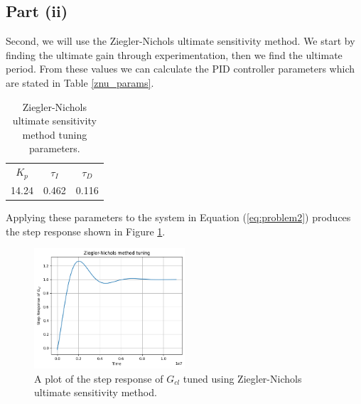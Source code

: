 \documentclass[10pt,a4paper]{article}
\begin{document}
    \subsection{Part (ii)}
        Second, we will use the Ziegler-Nichols ultimate sensitivity method. We start by finding the ultimate gain through experimentation, then we find the ultimate period. From these values we can calculate the PID controller parameters which are stated in Table \ref{znu_params}.
        \begin{table}[h]
            \centering
            \begin{tabular}{ c | c | c }
                $K_p$ & $\tau_I$ & $\tau_D$ \\
                14.24 & 0.462    & 0.116
            \end{tabular}
            \caption{Ziegler-Nichols ultimate sensitivity method tuning parameters.}
            \label{tb:znu_params}
        \end{table}
        Applying these parameters to the system in Equation (\ref{eq:problem2}) produces the step response shown in Figure \ref{fig:znu_gcl}.
        \begin{figure}[h]
            \centering
            \includegraphics[width=0.5\textwidth]{znu_Gcl.png}
            \caption{A plot of the step response of $G_{cl}$ tuned using Ziegler-Nichols ultimate sensitivity method.}
            \label{fig:znu_gcl}
        \end{figure}
    \printbibliography
\end{document}
